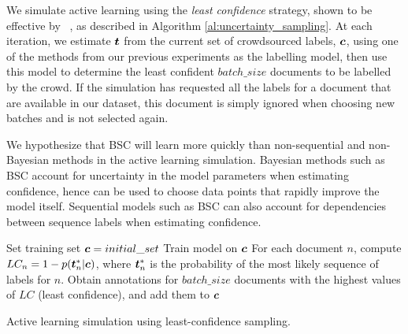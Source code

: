   We simulate active learning using 
 the \emph{least confidence} strategy, shown to be effective by 
 ~\citet{settles2008analysis},
 as described in Algorithm \ref{al:uncertainty_sampling}.
At each iteration, we estimate $\boldsymbol t$ from the current set of 
  crowdsourced labels, $\boldsymbol c$,
  using one of the methods from 
  our previous experiments as the labelling model,
  then use this model to determine the least confident $batch\_size$ 
 documents to be labelled by the crowd. 
  If the simulation has requested all the labels for a document that
  are available in our dataset, this document is simply ignored when 
  choosing new batches
  and is not selected again.
 
 We hypothesize that BSC will learn more quickly than non-sequential 
 and non-Bayesian methods
 in the active learning simulation. 
 Bayesian methods such as BSC account for uncertainty in the model parameters when estimating confidence,  
 hence can be used to choose data points that rapidly improve
 the model itself.
 Sequential models such as BSC can also account for dependencies between sequence labels
 when estimating confidence.
 
 \begin{algorithm}
 \DontPrintSemicolon
  \nl Set training set $\boldsymbol c=initial\_set$ \;
  {
  \nl Train model on $\boldsymbol c$ \;
  \nl For each document $n$, 
  compute $LC_n = 1-p(\boldsymbol t_n^*|\boldsymbol c)$, where $\boldsymbol t_n^*$ is the probability of the most likely sequence of labels 
  for $n$. \;
  \nl Obtain annotations for $batch\_size$ documents with the highest values of $LC$ (least confidence), and add them to $\boldsymbol c$\;
  }
 \caption{Active learning simulation using least-confidence sampling.}
 \label{al:uncertainty_sampling}
 \end{algorithm}
 
